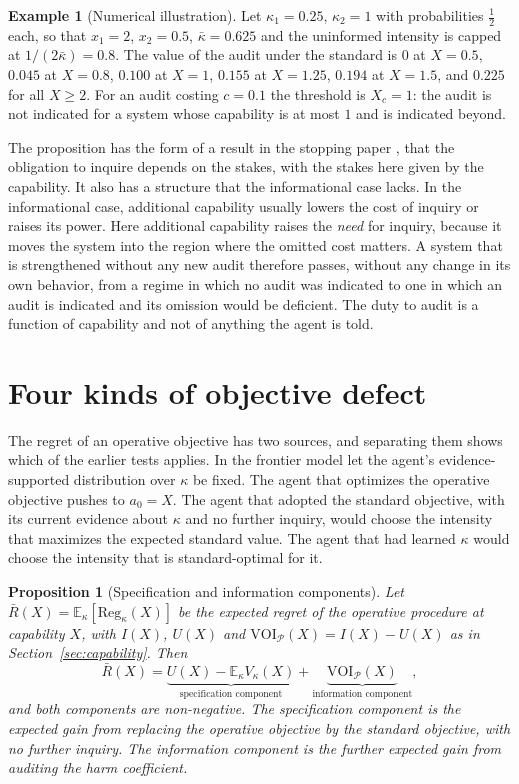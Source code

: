 \documentclass[11pt]{article}
\newcommand{\E}{\mathbb E}
\newcommand{\Reg}{\mathrm{Reg}}
\newcommand{\VOI}{\mathrm{VOI}}
\theoremstyle{plain}
\newtheorem{proposition}{Proposition}
\theoremstyle{definition}
\newtheorem{example}{Example}
\begin{document}
\begin{example}[Numerical illustration]\label{ex:voi}
Let $\kappa_1=0.25$, $\kappa_2=1$ with probabilities $\tfrac12$ each, so that $x_1=2$, $x_2=0.5$, $\bar\kappa=0.625$ and the uninformed intensity is capped at $1/(2\bar\kappa)=0.8$. The value of the audit under the standard is $0$ at $X=0.5$, $0.045$ at $X=0.8$, $0.100$ at $X=1$, $0.155$ at $X=1.25$, $0.194$ at $X=1.5$, and $0.225$ for all $X\ge2$. For an audit costing $c=0.1$ the threshold is $X_c=1$: the audit is not indicated for a system whose capability is at most $1$ and is indicated beyond.
\end{example}

The proposition has the form of a result in the stopping paper \cite{flyxion2026stop}, that the obligation to inquire depends on the stakes, with the stakes here given by the capability. It also has a structure that the informational case lacks. In the informational case, additional capability usually lowers the cost of inquiry or raises its power. Here additional capability raises the \emph{need} for inquiry, because it moves the system into the region where the omitted cost matters. A system that is strengthened without any new audit therefore passes, without any change in its own behavior, from a regime in which no audit was indicated to one in which an audit is indicated and its omission would be deficient. The duty to audit is a function of capability and not of anything the agent is told.

\section{Four kinds of objective defect}\label{sec:kinds}

The regret of an operative objective has two sources, and separating them shows which of the earlier tests applies. In the frontier model let the agent's evidence-supported distribution over $\kappa$ be fixed. The agent that optimizes the operative objective pushes to $a_0=X$. The agent that adopted the standard objective, with its current evidence about $\kappa$ and no further inquiry, would choose the intensity that maximizes the expected standard value. The agent that had learned $\kappa$ would choose the intensity that is standard-optimal for it.

\begin{proposition}[Specification and information components]\label{prop:decomp}
Let $\bar R(X)=\E_\kappa[\Reg_\kappa(X)]$ be the expected regret of the operative procedure at capability $X$, with $I(X)$, $U(X)$ and $\VOI_{\mathcal P}(X)=I(X)-U(X)$ as in Section~\ref{sec:capability}. Then
\[
\bar R(X)=\underbrace{U(X)-\E_\kappa V_\kappa(X)}_{\text{specification component}}+\underbrace{\VOI_{\mathcal P}(X)}_{\text{information component}},
\]
and both components are non-negative. The specification component is the expected gain from replacing the operative objective by the standard objective, with no further inquiry. The information component is the further expected gain from auditing the harm coefficient.
\end{proposition}
\end{document}
